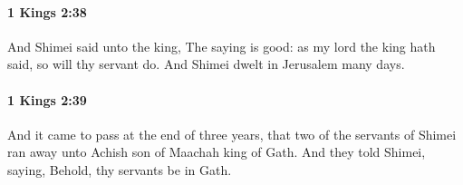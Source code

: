 		\paragraph{1 Kings 2:38} %
			\label{1KINGS-2-38}

			And Shimei said unto the king, The saying is good: as my lord the king hath said, so will thy servant do. And Shimei dwelt in Jerusalem many days.


		\paragraph{1 Kings 2:39} %
			\label{1KINGS-2-39}

			And it came to pass at the end of three years, that two of the servants of Shimei ran away unto Achish son of Maachah king of Gath. And they told Shimei, saying, Behold, thy servants be in Gath.


